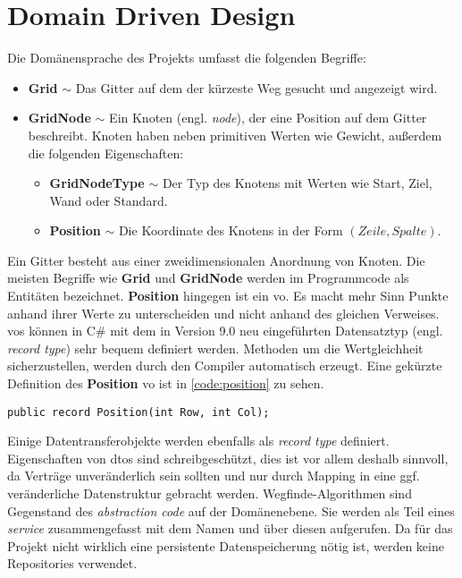 \part{Domain Driven Design}
Die Domänensprache des Projekts umfasst die folgenden Begriffe:
\begin{itemize}
      \item \textbf{Grid} $\sim$ Das Gitter auf dem der kürzeste Weg gesucht und
            angezeigt wird.
      \item \textbf{GridNode} $\sim$ Ein Knoten (engl. \textit{node}),
            der eine Position auf dem Gitter beschreibt. Knoten haben neben
            primitiven Werten wie Gewicht, außerdem die
            folgenden Eigenschaften:
            \begin{itemize}[topsep=0pt]
                  \item \textbf{GridNodeType} $\sim$ Der Typ des Knotens mit Werten
                        wie Start, Ziel, Wand oder Standard.
                  \item \textbf{Position} $\sim$ Die Koordinate des Knotens in der
                        Form $(Zeile,Spalte)$.
            \end{itemize}
\end{itemize}
Ein Gitter besteht aus einer zweidimensionalen Anordnung von Knoten.
Die meisten Begriffe wie \textbf{Grid} und \textbf{GridNode} werden
im Programmcode als Entitäten bezeichnet.
\textbf{Position} hingegen ist ein \ac{vo}. Es macht mehr Sinn Punkte anhand ihrer
Werte zu unterscheiden und nicht anhand des gleichen Verweises.
\acp{vo} können in C\# mit dem in Version 9.0 neu eingeführten
Datensatztyp (engl. \textit{record type}) sehr bequem definiert werden.
Methoden um die Wertgleichheit sicherzustellen,
werden durch den Compiler automatisch erzeugt.
Eine gekürzte Definition des \textbf{Position} \ac{vo} ist in \autoref{code:position}
zu sehen.
\begin{lstlisting}[caption={Der Datensatztyp einer Koordinate},label={code:position}]
public record Position(int Row, int Col);
\end{lstlisting}
Einige Datentransferobjekte werden ebenfalls als \textit{record type} definiert.
Eigenschaften von \acp{dto} sind schreibgeschützt,
dies ist vor allem deshalb sinnvoll, da Verträge un\-veränderlich sein sollten
und nur durch Mapping in eine ggf. veränderliche Datenstruktur gebracht werden.
Wegfinde-Algorithmen sind Gegenstand des \textit{abstraction code} auf
der Domänenebene. Sie werden als Teil eines \textit{service}
zusammengefasst mit dem Namen  und
über diesen aufgerufen. Da für das Projekt nicht wirklich
eine persistente Datenspeicherung nötig ist, werden keine
Repositories verwendet.